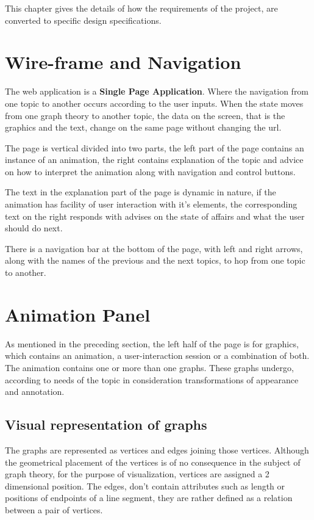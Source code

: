 
This chapter gives the details of how the requirements of the project, are
converted to specific design specifications.



\section{Wire-frame and Navigation}

The web application is a \textbf{Single Page Application}. Where the navigation
from one topic to another occurs according to the user inputs. When the state
moves from one graph theory to another topic, the data on the screen, that is
the graphics and the text, change on the same page without changing the url.

The page is vertical divided into two parts, the left part of the page contains
an instance of an animation, the right contains explanation of the topic and
advice on how to interpret the animation along with navigation and control
buttons. 

The text in the explanation part of the page is dynamic in nature, if the
animation has facility of user interaction with it's elements, the
corresponding text on the right responds with advises on the state of affairs
and what the user should do next.

There is a navigation bar at the bottom of the page, with left and right
arrows, along with the names of the previous and the next topics, to hop from
one topic to another.


\section{Animation Panel} 
As mentioned in the preceding section, the left half of the page is for
graphics, which contains an animation, a user-interaction session or a
combination of both.  The animation contains one or more than one graphs. These
graphs undergo, according to needs of the topic in consideration
transformations of appearance and annotation.

\subsection{Visual representation of graphs} 
The graphs are represented as vertices and edges joining those vertices.
Although the geometrical placement of the vertices is of no consequence in the
subject of graph theory, for the purpose of visualization, vertices are
assigned a 2 dimensional position. The edges, don't contain attributes such as
length or positions of endpoints of a line segment, they are rather defined as
a relation between a pair of vertices.

